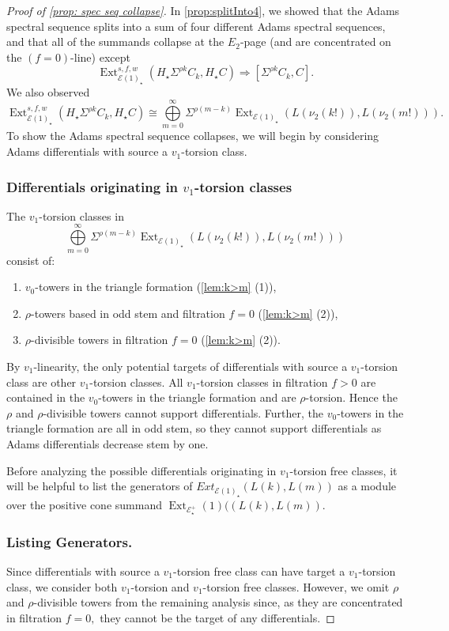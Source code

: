 \documentclass{amsart}
\theoremstyle{plain}
\numberwithin{equation}{section}
\numberwithin{figure}{section}
\DeclareMathOperator{\Ext}{Ext}
\newcommand{\cE}{{\mathcal E}}
\newcommand{\0}{\langle 0 \rangle }
\begin{document}
\begin{proof}[Proof of \cref{prop: spec seq collapse}]
In \cref{prop:splitInto4}, we showed that the Adams spectral sequence splits into a sum of four different Adams spectral sequences, and that all of the summands collapse at the $E_2$-page (and are concentrated on the $(f = 0)$-line) except  
\[ 
\Ext_{\mathcal{E}(1)_\star}^{s,f,w} (H_\star \Sigma^{\rho k}C_{k}, H_\star C) \Longrightarrow [\Sigma^{\rho k}C_{k}, C] .
\]
We also observed
\[ 
\Ext_{\mathcal{E}(1)_\star}^{s,f,w} (H_\star\Sigma^{\rho k} C_{k}, H_\star C) \cong  \bigoplus\limits_{m=0}^\infty \Sigma^{\rho (m-k)} \Ext_{\mathcal{E}(1)_\star} (L (\nu_2(k!)), L(\nu_2(m!))) .
\] 
To show the Adams spectral sequence collapses, we will begin by considering Adams differentials with source a $v_{1}$-torsion class.

\subsubsection{Differentials originating in $v_{1}$-torsion classes} The $v_{1}$-torsion classes in \[
\bigoplus\limits_{m=0}^\infty \Sigma^{\rho (m-k)} \Ext_{\mathcal{E}(1)_\star} (L (\nu_2(k!)), L(\nu_2(m!)))
\]
consist of: 
\begin{enumerate}
    \item $v_0$-towers in the triangle formation (\cref{lem:k>m} (1)),
    \item $\rho$-towers based in odd stem and filtration $f = 0$ (\cref{lem:k>m} (2)),
    \item $\rho$-divisible towers in filtration $f=0$ (\cref{lem:k>m} (2)). 
\end{enumerate} 

By $v_1$-linearity, the only potential targets of differentials with source a $v_1$-torsion class are other $v_1$-torsion classes. All $v_1$-torsion classes in filtration $f > 0$ are contained in the $v_0$-towers in the triangle formation and are $\rho$-torsion. Hence the $\rho$ and $\rho$-divisible towers cannot support differentials. Further, the $v_0$-towers in the triangle formation are all in odd stem, so they cannot support differentials as Adams differentials decrease stem by one. 

Before analyzing the possible differentials originating in $v_{1}$-torsion free classes, it will be helpful to list the generators of $Ext_{\cE(1)_{\star}}(L(k), L(m))$ as a module over the positive cone summand $\Ext_{\cE^{+}_\star}(1)((L(k), L(m))$. 
 
\subsubsection{Listing Generators.} Since differentials with source a $v_1$-torsion free class can have target a $v_1$-torsion class, we consider both $v_1$-torsion and $v_1$-torsion free classes. However, we omit $\rho$ and $\rho$-divisible towers from the remaining analysis since, as they are concentrated in filtration $f=0,$ they cannot be the target of any differentials.


\end{proof}
\end{document}
